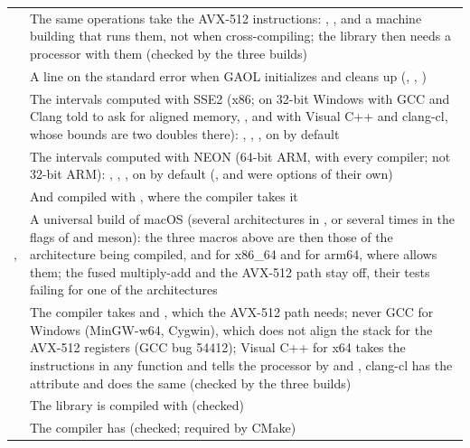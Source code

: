 \documentclass[12pt,a4paper,twoside,openright]{book}
\begin{document}
\begin{longtable}{L{4.6cm}L{9.4cm}}
   & The same operations take the AVX-512
  instructions: , ,
  and a machine building that runs them, not when cross-compiling; the
  library then needs a processor with them (checked by the three builds)\\
   & A line on the standard error when GAOL
  initializes and cleans up (,
  , )\\
   & The intervals computed with SSE2
  (x86; on 32-bit Windows with GCC and Clang told to ask for aligned memory,
  , and with Visual C++ and clang-cl, whose bounds
  are two doubles there): , ,
  , on by default\\
   & The intervals computed with NEON
  (64-bit ARM, with every compiler; not 32-bit ARM): ,
  , , on by default
  (,  and  were
  options of their own)\\
   & And compiled with ,
  where the compiler takes it\\
  ,  & A universal
  build of macOS (several architectures in ,
  or  several times in the flags of  and meson):
  the three macros above are then those of the architecture being compiled,
   and
   for x86\_64 and
   for arm64, where 
  allows them; the fused multiply-add and the AVX-512 path stay off, their
  tests failing for one of the architectures\\
   & The compiler takes
   and
  , which the AVX-512 path needs;
  never GCC for Windows (MinGW-w64, Cygwin), which does not align the stack
  for the AVX-512 registers (GCC bug 54412); Visual C++ for x64 takes the
  instructions in any function and tells the processor by  and
  , clang-cl has the attribute and does the same (checked by the
  three builds)\\
   & The library is compiled with
   (checked)\\
   & The compiler has  (checked;
  required by CMake)\\
\end{longtable}
\end{document}
